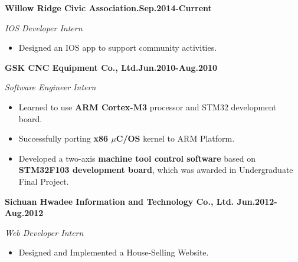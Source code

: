 \documentclass{myres}
\begin{document}
{
	\textbf{Willow Ridge Civic Association.\hfill Sep.2014-Current}
	\par
	{\it IOS Developer Intern}
	\begin{itemize}[topsep=0pt, leftmargin=0.2in] \itemsep -5pt
		\item Designed an IOS app to support community activities. 
	\end{itemize}
	\par
	\smallskip
	\textbf{GSK CNC Equipment Co., Ltd.\hfill Jun.2010-Aug.2010}
	\par
	{\it Software Engineer Intern}
  \begin{itemize}[topsep=0pt, leftmargin=0.2in] \itemsep -5pt
			\item Learned to use \textbf{ARM Cortex-M3} processor and STM32 development board.
			\item Successfully porting \textbf{x86 $\mu$C/OS} kernel to ARM Platform.
			\item Developed a two-axis \textbf{machine tool control software} based on
				\textbf{STM32F103 development board}, which was awarded in Undergraduate Final Project.
	\end{itemize}
	\par
	\smallskip
	\textbf{Sichuan Hwadee Information and Technology Co., Ltd. \hfill Jun.2012-Aug.2012}
	\par
	{\it Web Developer Intern}
  \begin{itemize}[topsep=0pt, leftmargin=0.2in] \itemsep -5pt
		\item Designed and Implemented a House-Selling Website.
	\end{itemize}
	\par
}
\end{document}
